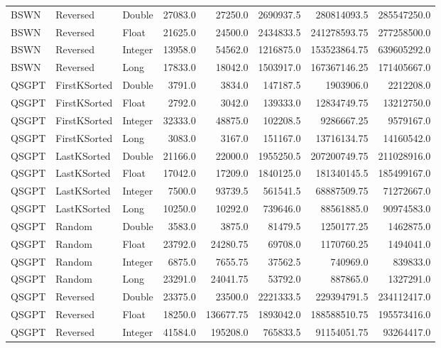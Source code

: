 \documentclass[unicode,11pt,a4paper,oneside,numbers=endperiod,openany]{scrartcl}
\begin{document}
\begin{center}
\begin{longtable}{|l|l|l|r|r|r|r|r|}
            BSWN & Reversed & Double & 27083.0 & 27250.0 & 2690937.5 & 280814093.5 & 285547250.0 \\
            BSWN & Reversed & Float & 21625.0 & 24500.0 & 2434833.5 & 241278593.75 & 277258500.0 \\
            BSWN & Reversed & Integer & 13958.0 & 54562.0 & 1216875.0 & 153523864.75 & 639605292.0 \\
            BSWN & Reversed & Long & 17833.0 & 18042.0 & 1503917.0 & 167367146.25 & 171405667.0 \\
            QSGPT & FirstKSorted & Double & 3791.0 & 3834.0 & 147187.5 & 1903906.0 & 2212208.0 \\
            QSGPT & FirstKSorted & Float & 2792.0 & 3042.0 & 139333.0 & 12834749.75 & 13212750.0 \\
            QSGPT & FirstKSorted & Integer & 32333.0 & 48875.0 & 102208.5 & 9286667.25 & 9579167.0 \\
            QSGPT & FirstKSorted & Long & 3083.0 & 3167.0 & 151167.0 & 13716134.75 & 14160542.0 \\
            QSGPT & LastKSorted & Double & 21166.0 & 22000.0 & 1955250.5 & 207200749.75 & 211028916.0 \\
            QSGPT & LastKSorted & Float & 17042.0 & 17209.0 & 1840125.0 & 181340145.5 & 185499167.0 \\
            QSGPT & LastKSorted & Integer & 7500.0 & 93739.5 & 561541.5 & 68887509.75 & 71272667.0 \\
            QSGPT & LastKSorted & Long & 10250.0 & 10292.0 & 739646.0 & 88561885.0 & 90974583.0 \\
            QSGPT & Random & Double & 3583.0 & 3875.0 & 81479.5 & 1250177.25 & 1462875.0 \\
            QSGPT & Random & Float & 23792.0 & 24280.75 & 69708.0 & 1170760.25 & 1494041.0 \\
            QSGPT & Random & Integer & 6875.0 & 7655.75 & 37562.5 & 740969.0 & 839833.0 \\
            QSGPT & Random & Long & 23291.0 & 24041.75 & 53792.0 & 887865.0 & 1327291.0 \\
            QSGPT & Reversed & Double & 23375.0 & 23500.0 & 2221333.5 & 229394791.5 & 234112417.0 \\
            QSGPT & Reversed & Float & 18250.0 & 136677.75 & 1893042.0 & 188588510.75 & 195573416.0 \\
            QSGPT & Reversed & Integer & 41584.0 & 195208.0 & 765833.5 & 91154051.75 & 93264417.0 \\

\end{longtable}
\end{center}
\end{document}
